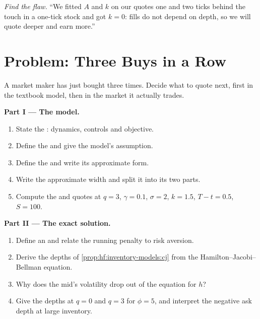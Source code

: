 \begin{exercise}[$\star\star\star$]\label{exo:hf:inventory-models:8}
\emph{Find the flaw.} ``We fitted $A$ and $k$ on our quotes one and two ticks behind the touch in a one-tick stock and got $k=0$: fills do not depend
on depth, so we will quote deeper and earn more.''
\end{exercise}

\section{Problem: Three Buys in a Row}

\begin{problem}\label{pb:hf:inventory-models:1}
A market maker has just bought three times. Decide what to quote next, first in the textbook model, then in the market it actually trades.

\medskip\noindent\textbf{Part I --- The model.}
\begin{enumerate}
\item State the : dynamics, controls and objective.
\item Define the  and give the model's assumption.
\item Define the  and write its approximate form.
\item Write the approximate width and split it into its two parts.
\item Compute the  and quotes at $q=3$, $\gamma=0.1$, $\sigma=2$, $k=1.5$, $T-t=0.5$, $S=100$.
\end{enumerate}

\medskip\noindent\textbf{Part II --- The exact solution.}
\begin{enumerate}[resume]
\item Define an  and relate the running penalty to risk aversion.
\item Derive the depths of \cref{prop:hf:inventory-models:cj} from the Hamilton--Jacobi--Bellman equation.
\item Why does the mid's volatility drop out of the equation for $h$?
\item Give the depths at $q=0$ and $q=3$ for $\phi=5$, and interpret the negative ask depth at large inventory.
\end{enumerate}


\end{problem}
